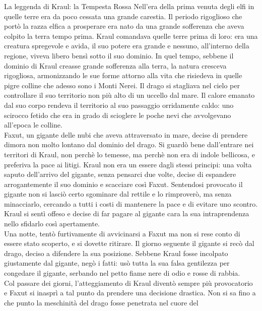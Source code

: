 \documentclass[10pt,twoside,twocolumn]{article}
\begin{document}
\begin{commentbox}{La leggenda di Kraul: la Tempesta Rossa}
  Nell'era della prima venuta degli elfi in quelle terre era da poco cessata una grande
  carestia. Il periodo rigoglioso che port\`o la razza elfica a prosperare era nato da
  una grande sofferenza che aveva colpito la terra tempo prima.
  Kraul comandava quelle terre prima di loro:
  era una creatura spregevole e avida, il suo potere era grande e nessuno,
  all'interno della regione, viveva libero bens\`i sotto il suo dominio.
  In quel tempo, sebbene il dominio di Kraul creasse grande sofferenza alla terra,
  la natura cresceva rigogliosa, armonizzando le sue forme attorno alla vita che risiedeva
  in quelle pigre colline che adesso sono i Monti Nerei.
  Il drago si stagliava nel cielo per controllare il suo territorio non pi\`u alto di un
  uccello dal mare. Il calore emanato dal suo corpo rendeva il territorio al suo passaggio
  orridamente caldo: uno scirocco fetido che era in grado di scioglere le poche nevi che
  avvolgevano all'epoca le colline.\\
  Faxut, un gigante delle nubi che aveva attraversato in mare, decise di prendere dimora
  non molto lontano dal dominio del drago. Si guard\`o bene dall'entrare nei territori di
  Kraul, non perch\`e lo temesse, ma perch\`e non era di indole bellicosa, e preferiva la
  pace ai litigi. Kraul non era un essere dagli stessi principi: una volta saputo
  dell'arrivo del gigante, senza pensarci due volte, decise di espandere arrogantemente
  il suo dominio e scacciare cos\`i Faxut.
  Sentendosi provocato il gigante non si lasci\`o certo sgominare dal rettile e lo
  rimprover\`o, ma senza minacciarlo, cercando a tutti i costi di mantenere la pace
  e di evitare uno scontro.
  Kraul si sent\`i offeso e decise di far pagare al gigante cara la sua intraprendenza
  nello sfidarlo cos\`i apertamente.\\
  Una notte, tent\`o furtivamente di avvicinarsi
  a Faxut ma non si rese conto di essere stato scoperto, e si dovette ritirare.
  Il giorno seguente il gigante si rec\`o dal drago, deciso a difendere la sua posizione.
  Sebbene Kraul fosse incolpato giustamente dal gigante, neg\`o i fatti: us\`o tutta
  la sua falsa gentilezza per congedare il gigante, serbando nel petto fiame nere di odio e
  rosse di rabbia.\\
  Col passare dei giorni, l'atteggiamento di Kraul divent\`o sempre pi\`u
  provocatorio e Faxut si inaspr\`i a tal punto da prendere una decisione drastica.
  Non si sa fino a che punto la meschinit\`a del drago fosse penetrata nel cuore del

\end{commentbox}
\end{document}
